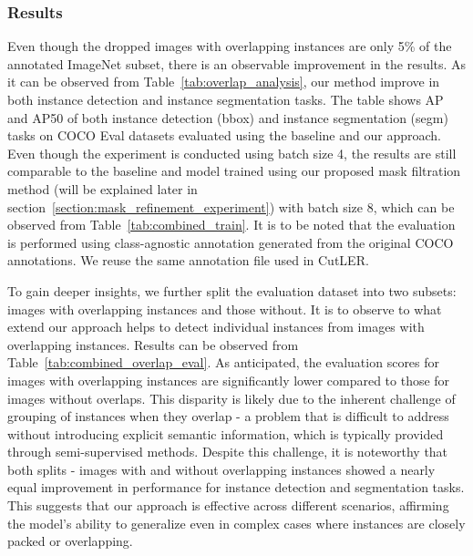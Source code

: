 \subsubsection{Results}
\label{section:overlapping-results}
Even though the dropped images with overlapping instances are only 5\% of the annotated ImageNet subset, there is an observable improvement in the results. As it can be observed from Table~\ref{tab:overlap_analysis}, our method improve in both instance detection and instance segmentation tasks. The table shows AP and AP50 of both instance detection (bbox) and instance segmentation (segm) tasks on COCO Eval datasets evaluated using the baseline and our approach. Even though the experiment is conducted using batch size 4, the results are still comparable to the baseline and model trained using our proposed mask filtration method (will be explained later in section~\ref{section:mask_refinement_experiment}) with batch size 8, which can be observed from Table~\ref{tab:combined_train}. It is to be noted that the evaluation is performed using class-agnostic annotation generated from the original COCO annotations. We reuse the same annotation file used in CutLER.

To gain deeper insights, we further split the evaluation dataset into two subsets: images with overlapping instances and those without. It is to observe to what extend our approach helps to detect individual instances from images with overlapping instances. Results can be observed from Table~\ref{tab:combined_overlap_eval}. As anticipated, the evaluation scores for images with overlapping instances are significantly lower compared to those for images without overlaps. This disparity is likely due to the inherent challenge of grouping of instances when they overlap - a problem that is difficult to address without introducing explicit semantic information, which is typically provided through semi-supervised methods. Despite this challenge, it is noteworthy that both splits - images with and without overlapping instances showed a nearly equal improvement in performance for instance detection and segmentation tasks. This suggests that our approach is effective across different scenarios, affirming the model’s ability to generalize even in complex cases where instances are closely packed or overlapping.

